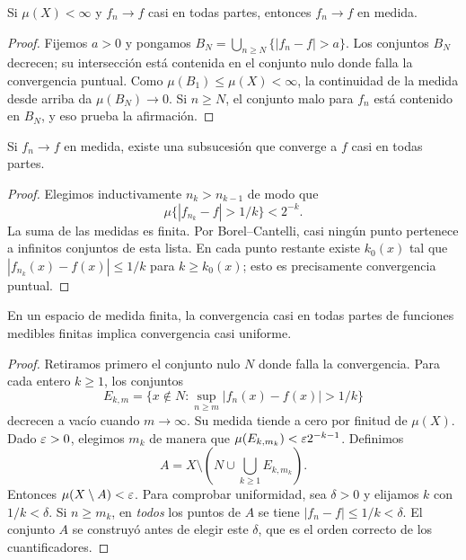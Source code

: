 \begin{teorema}\label{teo:v2-ae-medida}
Si $\mu(X)<\infty$ y $f_n\to f$ casi en todas partes, entonces $f_n\to f$ en medida.
\end{teorema}
\begin{proof}
Fijemos $a>0$ y pongamos $B_N=\bigcup_{n\ge N}\{|f_n-f|>a\}$. Los conjuntos $B_N$ decrecen; su intersección está contenida en el conjunto nulo donde falla la convergencia puntual. Como $\mu(B_1)\le\mu(X)<\infty$, la continuidad de la medida desde arriba da $\mu(B_N)\to0$. Si $n\ge N$, el conjunto malo para $f_n$ está contenido en $B_N$, y eso prueba la afirmación.
\end{proof}

\begin{teorema}\label{teo:v2-medida-ae}
Si $f_n\to f$ en medida, existe una subsucesión que converge a $f$ casi en todas partes.
\end{teorema}
\begin{proof}
Elegimos inductivamente $n_k>n_{k-1}$ de modo que
\[\mu\{|f_{n_k}-f|>1/k\}<2^{-k}.
\]
La suma de las medidas es finita. Por Borel--Cantelli, casi ningún punto pertenece a infinitos conjuntos de esta lista. En cada punto restante existe $k_0(x)$ tal que $|f_{n_k}(x)-f(x)|\le1/k$ para $k\ge k_0(x)$; esto es precisamente convergencia puntual.
\end{proof}

\begin{teorema}[Egorov]\label{teo:v2-egorov}
En un espacio de medida finita, la convergencia casi en todas partes de funciones medibles finitas implica convergencia casi uniforme.
\end{teorema}
\begin{proof}
Retiramos primero el conjunto nulo $N$ donde falla la convergencia. Para cada entero $k\ge1$, los conjuntos
\[E_{k,m}=\{x\notin N:\sup_{n\ge m}|f_n(x)-f(x)|>1/k\}
\]
decrecen a vacío cuando $m\to\infty$. Su medida tiende a cero por finitud de $\mu(X)$. Dado $\varepsilon>0$, elegimos $m_k$ de manera que $\mu(E_{k,m_k})<\varepsilon2^{-k-1}$. Definimos
\[A=X\setminus\left(N\cup\bigcup_{k\ge1}E_{k,m_k}\right).
\]
Entonces $\mu(X\setminus A)<\varepsilon$. Para comprobar uniformidad, sea $\delta>0$ y elijamos $k$ con $1/k<\delta$. Si $n\ge m_k$, en \emph{todos} los puntos de $A$ se tiene $|f_n-f|\le1/k<\delta$. El conjunto $A$ se construyó antes de elegir este $\delta$, que es el orden correcto de los cuantificadores.
\end{proof}

